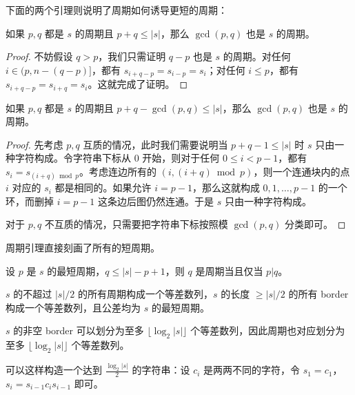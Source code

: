 下面的两个引理则说明了周期如何诱导更短的周期：
\begin{lemma}[弱周期引理]
    如果 $p,q$ 都是 $s$ 的周期且 $p+q\le |s|$，那么 $\gcd(p,q)$ 也是 $s$ 的周期。
\end{lemma}
\begin{proof}
    不妨假设 $q>p$，我们只需证明 $q-p$ 也是 $s$ 的周期。对任何 $i\in (p,n-(q-p)]$，都有 $s_{i+q-p}=s_{i-p}=s_i$；对任何 $i\le p$，都有 $s_{i+q-p}=s_{i+q}=s_i$。这就完成了证明。
\end{proof}
\begin{lemma}[周期引理]
    如果 $p,q$ 都是 $s$ 的周期且 $p+q-\gcd(p,q)\le|s|$，那么 $\gcd(p,q)$ 也是 $s$ 的周期。
\end{lemma}
\begin{proof}
    先考虑 $p,q$ 互质的情况，此时我们需要说明当 $p+q-1\le |s|$ 时 $s$ 只由一种字符构成。令字符串下标从 $0$ 开始，则对于任何 $0\le i<p-1$，都有 $s_i=s_{(i+q)\bmod p}$。考虑连边所有的 $(i,(i+q)\bmod p)$，则一个连通块内的点 $i$ 对应的 $s_i$ 都是相同的。如果允许 $i=p-1$，那么这就构成 $0,1,\ldots,p-1$ 的一个环，而删掉 $i=p-1$ 这条边后图仍然连通。于是 $s$ 只由一种字符构成。

    对于 $p,q$ 不互质的情况，只需要把字符串下标按照模 $\gcd(p,q)$ 分类即可。
\end{proof}



周期引理直接刻画了所有的短周期。
\begin{corollary}\label{cor:characterization of short periods}
    设 $p$ 是 $s$ 的最短周期，$q\le |s|-p+1$，则 $q$ 是周期当且仅当 $p|q$。
\end{corollary}
\begin{corollary}
    $s$ 的不超过 $|s|/2$ 的所有周期构成一个等差数列，$s$ 的长度 $\ge |s|/2$ 的所有 border 构成一个等差数列，且公差均为 $s$ 的最短周期。
\end{corollary}
\begin{corollary}
    $s$ 的非空 border 可以划分为至多 $\lfloor\log_2 |s|\rfloor$ 个等差数列，因此周期也对应划分为至多 $\lfloor\log_2 |s|\rfloor$ 个等差数列。
\end{corollary}
\begin{remark}
    可以这样构造一个达到 $\frac{\log_2 |s|}{2}$ 的字符串：设 $c_i$ 是两两不同的字符，令 $s_1=c_1$，$s_i=s_{i-1}c_is_{i-1}$ 即可。
\end{remark}

